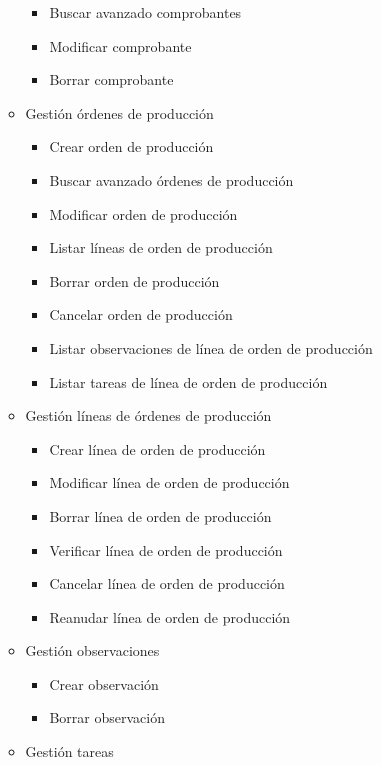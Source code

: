\begin{itemize}
\begin{itemize}
\begin{itemize}
                \item Buscar avanzado comprobantes
                \item Modificar comprobante
                \item Borrar comprobante
            \end{itemize}
            \item Gestión órdenes de producción
            \begin{itemize}
                \item Crear orden de producción
                \item Buscar avanzado órdenes de producción
                \item Modificar orden de producción
                \item Listar líneas de orden de producción
                \item Borrar orden de producción
                \item Cancelar orden de producción
                \item Listar observaciones de línea de orden de producción
                \item Listar tareas de línea de orden de producción
            \end{itemize}
            \item Gestión líneas de órdenes de producción
            \begin{itemize}
                \item Crear línea de orden de producción
                \item Modificar línea de orden de producción
                \item Borrar línea de orden de producción
                \item Verificar línea de orden de producción
                \item Cancelar línea de orden de producción	
                \item Reanudar línea de orden de producción		
            \end{itemize}
            \item Gestión observaciones
            \begin{itemize}
                \item Crear observación
                \item Borrar observación
            \end{itemize}
            \item Gestión tareas

\end{itemize}
\end{itemize}
